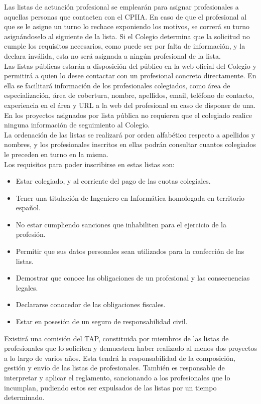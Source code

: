 Las listas de actuación profesional se emplearán para asignar profesionales a aquellas personas que contacten con el CPIIA. En caso de que el profesional al que se le asigne un turno lo rechace exponiendo los motivos, se correrá su turno asignándoselo al siguiente de la lista. Si el Colegio determina que la solicitud no cumple los requisitos necesarios, como puede ser por falta de información, y la declara inválida, esta no será asignada a ningún profesional de la lista. \\

Las listas públicas estarán a disposición del público en la web oficial del Colegio y permitirá a quien lo desee contactar con un profesional concreto directamente. En ella se facilitará información de los profesionales colegiados, como área de especialización, área de cobertura, nombre, apellidos, email, teléfono de contacto, experiencia en el área y URL a la web del profesional en caso de disponer de una. En los proyectos asignados por lista pública no requieren que el colegiado realice ninguna información de seguimiento al Colegio. \\

La ordenación de las listas se realizará por orden alfabético respecto a apellidos y nombres, y los profesionales inscritos en ellas podrán consultar cuantos colegiados le preceden en turno en la misma. \\

Los requisitos para poder inscribirse en estas listas son:
\begin{itemize}
	\item Estar colegiado, y al corriente del pago de las cuotas colegiales.
	\item Tener una titulación de Ingeniero en Informática homologada en territorio español.
	\item No estar cumpliendo sanciones que inhabiliten para el ejercicio de la profesión.
	\item Permitir que sus datos personales sean utilizados para la confección de las listas.
	\item Demostrar que conoce las obligaciones de un profesional y las consecuencias legales.
	\item Declararse conocedor de las obligaciones fiscales.
	\item Estar en posesión de un seguro de responsabilidad civil. \\
\end{itemize} 

Existirá una comisión del TAP, constituida por miembros de las listas de profesionales que lo soliciten y demuestren haber realizado al menos dos proyectos a lo largo de varios años. Esta tendrá la responsabilidad de la composición, gestión y envío de las listas de profesionales. También es responsable de interpretar y aplicar el reglamento, sancionando a los profesionales que lo incumplan, pudiendo estos ser expulsados de las listas por un tiempo determinado. \\

